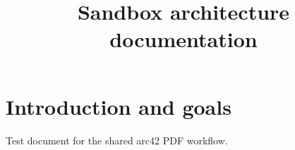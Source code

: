 \documentclass{article}
\title{Sandbox architecture documentation}
\begin{document}
\maketitle
\section{Introduction and goals}
Test document for the shared arc42 PDF workflow.
\end{document}
